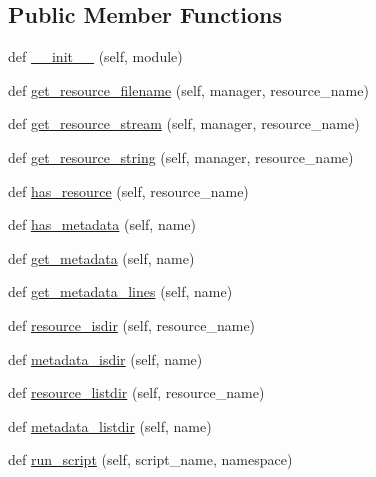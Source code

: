 \subsection*{Public Member Functions}
\begin{DoxyCompactItemize}
\item 
def \hyperlink{classpip_1_1__vendor_1_1pkg__resources_1_1NullProvider_aa00f0e3c6a00cfc7c7ad0f31cdeb492d}{\+\_\+\+\_\+init\+\_\+\+\_\+} (self, module)
\item 
def \hyperlink{classpip_1_1__vendor_1_1pkg__resources_1_1NullProvider_a6e284f58509177b1004fc920515a40ce}{get\+\_\+resource\+\_\+filename} (self, manager, resource\+\_\+name)
\item 
def \hyperlink{classpip_1_1__vendor_1_1pkg__resources_1_1NullProvider_ae7f0a7311594c8cdc3c2b2c4f2f73296}{get\+\_\+resource\+\_\+stream} (self, manager, resource\+\_\+name)
\item 
def \hyperlink{classpip_1_1__vendor_1_1pkg__resources_1_1NullProvider_a2931ac6124f2519aaddf8469581de1a4}{get\+\_\+resource\+\_\+string} (self, manager, resource\+\_\+name)
\item 
def \hyperlink{classpip_1_1__vendor_1_1pkg__resources_1_1NullProvider_add676aaa47b1904e31b7adb48b2c49ba}{has\+\_\+resource} (self, resource\+\_\+name)
\item 
def \hyperlink{classpip_1_1__vendor_1_1pkg__resources_1_1NullProvider_afe892cd52c54d3947c58f2fb8dc8c911}{has\+\_\+metadata} (self, name)
\item 
def \hyperlink{classpip_1_1__vendor_1_1pkg__resources_1_1NullProvider_afadc5fc87f103d3201d6cebffa6c0f18}{get\+\_\+metadata} (self, name)
\item 
def \hyperlink{classpip_1_1__vendor_1_1pkg__resources_1_1NullProvider_af9fe76eb0ebc5819cf0d2a2f3b8501af}{get\+\_\+metadata\+\_\+lines} (self, name)
\item 
def \hyperlink{classpip_1_1__vendor_1_1pkg__resources_1_1NullProvider_a974018f973ac6d671b7c23850ebc4765}{resource\+\_\+isdir} (self, resource\+\_\+name)
\item 
def \hyperlink{classpip_1_1__vendor_1_1pkg__resources_1_1NullProvider_ad5362b246c926649674f36ac90919732}{metadata\+\_\+isdir} (self, name)
\item 
def \hyperlink{classpip_1_1__vendor_1_1pkg__resources_1_1NullProvider_a954d4b5e70cf87e7869aa27a1c4b091c}{resource\+\_\+listdir} (self, resource\+\_\+name)
\item 
def \hyperlink{classpip_1_1__vendor_1_1pkg__resources_1_1NullProvider_ae31a32cfb5ca6f199d16976d46b4b818}{metadata\+\_\+listdir} (self, name)
\item 
def \hyperlink{classpip_1_1__vendor_1_1pkg__resources_1_1NullProvider_ad3cba73f9f405f1e3e3567ad9295aae2}{run\+\_\+script} (self, script\+\_\+name, namespace)
\end{DoxyCompactItemize}
